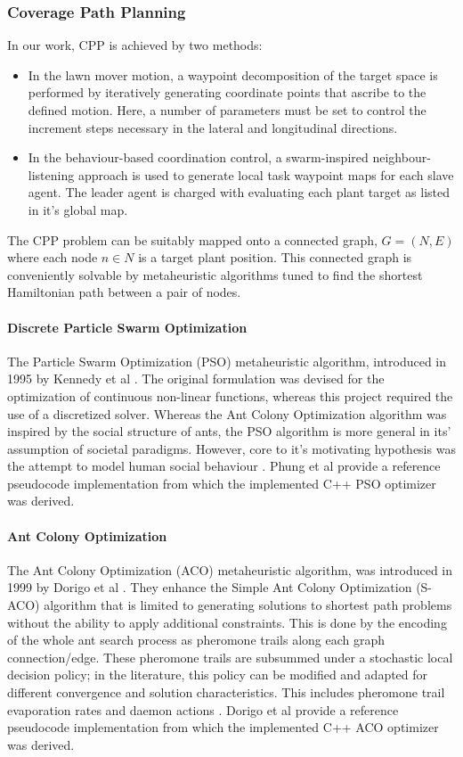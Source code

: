 \documentclass{report}
\begin{document}
\subsubsection{Coverage Path Planning}
In our work, CPP is achieved by two methods:
\begin{itemize}
	\item In the lawn mover motion, a waypoint decomposition of the target space is performed by iteratively generating coordinate points that ascribe to the defined motion. Here, a number of parameters must be set to control the increment steps necessary in the lateral and longitudinal directions.
	\item In the behaviour-based coordination control, a swarm-inspired neighbour-listening approach is used to generate local task waypoint maps for each slave agent. The leader agent is charged with evaluating each plant target as listed in it’s global map.
\end{itemize}

The CPP problem can be suitably mapped onto a connected graph, \textit{$G = (N, E)$} where each node \textit{$n \in N$} is a target plant position. This connected graph is conveniently solvable by metaheuristic algorithms tuned to find the shortest Hamiltonian path between a pair of nodes.

\paragraph{Discrete Particle Swarm Optimization}
The Particle Swarm Optimization (PSO) metaheuristic algorithm, introduced in 1995 by Kennedy et al \cite{Kennedy1995}. The original formulation was devised for the optimization of continuous non-linear functions, whereas this project required the use of a discretized solver. Whereas the Ant Colony Optimization algorithm was inspired by the social structure of ants, the PSO algorithm is more general in its' assumption of societal paradigms. However, core to it's motivating hypothesis was the attempt to model human social behaviour \cite{Kennedy1995}. Phung et al \cite{Phung2017} provide a reference pseudocode implementation from which the implemented C++ PSO optimizer was derived.

\paragraph{Ant Colony Optimization}
The Ant Colony Optimization (ACO) metaheuristic algorithm, was introduced in 1999 by Dorigo et al \cite{Dorigo1999}. They enhance the Simple Ant Colony Optimization (S-ACO) algorithm that is limited to generating solutions to shortest path problems without the ability to apply additional constraints. This is done by the encoding of the whole ant search process as pheromone trails along each graph connection/edge. These pheromone trails are subsummed under a stochastic local decision policy; in the literature, this policy can be modified and adapted for different convergence and solution characteristics. This includes pheromone trail evaporation rates and daemon actions \cite{Dorigo1999}. Dorigo et al \cite{Dorigo1999} provide a reference pseudocode implementation from which the implemented C++ ACO optimizer was derived.
\end{document}
